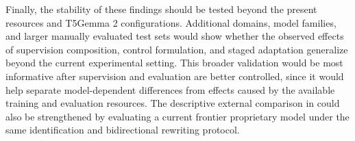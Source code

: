 {
Finally, the stability of these findings should be tested beyond the present
resources and T5Gemma 2 configurations. Additional domains, model families, and
larger manually evaluated test sets would show whether the observed effects of
supervision composition, control formulation, and staged adaptation generalize
beyond the current experimental setting. This broader validation would be most
informative after supervision and evaluation are better controlled, since it
would help separate model-dependent differences from effects caused by the
available training and evaluation resources. The descriptive external
comparison in  could also be
strengthened by evaluating a current frontier proprietary model under the same
identification and bidirectional rewriting protocol.\par}
